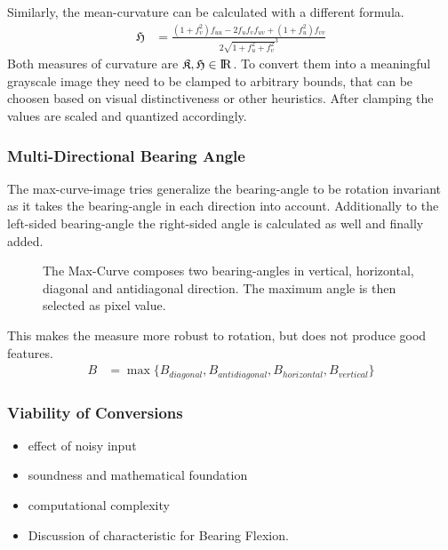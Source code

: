 Similarly, the \Gls{mean-curvature} can be calculated with a different formula.
\begin{align}
    \mathfrak{H} &= \frac{{(1 + f_{v}^2)} f_{uu} - 2 f_u f_v f_{uv} + {(1 + f_u^2)} f_{vv}}{2 \sqrt{1 + f_u^2 + f_v^2}^3}
\end{align}
Both measures of curvature are $\mathfrak{K},\mathfrak{H} \in {\rm I\!R}$.
To convert them into a meaningful grayscale image they need to be clamped to arbitrary bounds, that can be choosen based on visual distinctiveness or other heuristics.
After clamping the values are scaled and quantized accordingly.

\subsubsection{Multi-Directional Bearing Angle}

The \gls{max-curve-image} tries generalize the \gls{bearing-angle} to be rotation invariant as it takes the \gls{bearing-angle} in each direction into account.
Additionally to the left-sided \gls{bearing-angle} the right-sided angle is calculated as well and finally added.

\begin{figure}
    
    \caption[Schematic Representation of the Max-Curve]{The Max-Curve composes two \Glspl{bearing-angle} in vertical, horizontal, diagonal and antidiagonal direction. The maximum angle is then selected as pixel value.}
\end{figure}

This makes the measure more robust to rotation, but does not produce good features.
\begin{align}
    B &= \max{\{B_{diagonal}, B_{antidiagonal}, B_{horizontal}, B_{vertical}\}}
\end{align}

\subsubsection{Viability of Conversions}

\begin{itemize}
    \item effect of noisy input
    \item soundness and mathematical foundation
    \item computational complexity
    \item Discussion of characteristic for Bearing Flexion.
\end{itemize}

